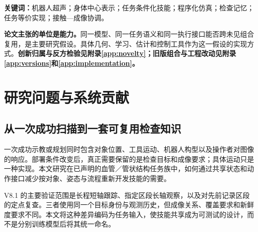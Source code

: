 \documentclass[UTF8,11pt,a4paper,fontset=fandol]{ctexart}
\numberwithin{equation}{section}
\theoremstyle{definition}
\begin{document}
\begin{abstract}
机器人超声检查需要在身体几何、内部目标与机器人执行条件共同变化时复用检查知识。记录一条 TCP 轨迹难以表达检查要求，而仅有通用几何先验也不足以支持当前对象的持续扫描。本文提出 Anatomical GPS V8.1：一种身体中心的共享感知—动作架构，将任务位置、成像关系、目标估计、观测来源与合格检查记忆放入同一状态。系统以程序化 Genesis 场景构造技能训练数据，以实际超声和登记后的执行状态更新当前目标；一个任务条件化策略只生成推进与允许视角的动作偏好，dIRD 与连续运动学选择实际实现，扩展后的 UltraPoC 外层 QP 则联合协调接触、目标成像与物理推进。方法保留 CoP 的增量法向—转动配对，并引入成像任务微分和实际站位速度约束，避免接触修正造成目标漂移，以及推进变量脱离真实运动。检查完成由带任务类型、时间与关联条件的实际图像足迹判定，同一对象姿态变化后对历史证据重新登记与验收。本文给出完整模型、学习目标、分层求解、条件性误差分析、实现接口和组合泛化实验协议。方法的拟议贡献是共享表示与执行接口带来的技能复用和数据效率，而非重新提出调和坐标、运动基元、滤波或 QP。附录逐项说明旧版取舍、外部先例、可主张的新颖性与所需证据；本稿仅报告可重复的局部代数检查，真实跨对象检查收益仍待实验验证。
\end{abstract}
\noindent\textbf{关键词：}机器人超声；身体中心表示；任务条件化技能；程序化仿真；检查记忆；任务等价实现；接触—成像协调。

\begin{keybox}
\textbf{论文主张的单位是能力。}同一模型、同一任务语义和同一执行接口能否跨未见组合复用，是主要研究假设。具体几何、学习、估计和控制工具作为这一假设的实现方式。\textbf{创新归属与反方检验见附录\ref{app:novelty}；旧版组合与工程改动见附录\ref{app:versions}和\ref{app:implementation}。}
\end{keybox}
\tableofcontents
\clearpage

\section{研究问题与系统贡献}
\label{sec:intro}
\subsection{从一次成功扫描到一套可复用检查知识}
一次成功示教或规划同时包含对象位置、工具运动、机器人构型以及操作者对图像的响应。部署条件改变后，真正需要保留的是检查目标和成像要求；具体运动只是一种实现。本文研究在已声明的血管／管状结构任务族中，如何通过共享状态和动作接口减少按对象、姿态与流程重新开发技能的需要。

V8.1 的主要验证范围是长程短轴跟踪、指定区段长轴观察，以及对先前记录区段的定点复查。三者使用同一个目标身份与观测历史，但成像关系、覆盖要求和新鲜度要求不同。本文将这种差异编码为任务输入，使技能共享成为可测试的设计，而不是分别训练模型后将其统一命名。
\end{document}
